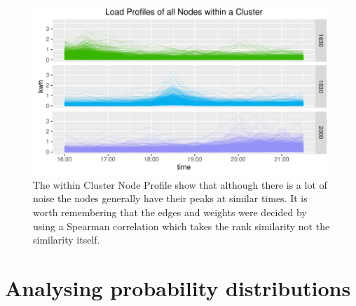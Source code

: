 \begin{figure}
    \centering
    \includegraphics[width=\textwidth]{Figures/Results/NodeProfilesInCluster}
    \caption[Within Cluster Node Profile]{The within Cluster Node Profile show that although there is a lot of noise the nodes generally have their peaks at similar times. It is worth remembering that the edges and weights were decided by using a Spearman correlation which takes the rank similarity not the similarity itself.}
    \label{fig:NodeProfilesInCluster}
\end{figure}


\section{Analysing probability distributions}

